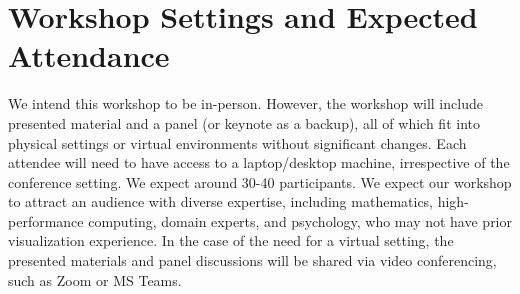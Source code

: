 \section{Workshop Settings and Expected Attendance}

We intend this workshop to be in-person. However, the workshop will include presented material and a panel (or keynote as a backup), all of which fit into physical settings or virtual environments without significant changes. Each attendee will need to have access to a laptop/desktop machine, irrespective of the conference setting. We expect around 30-40 participants. We expect our workshop to attract an audience with diverse expertise, including mathematics, high-performance computing, domain experts, and psychology, who may not have prior visualization experience. In the case of the need for a virtual setting, the presented materials and panel discussions will be shared via video conferencing, such as Zoom or MS Teams. 

